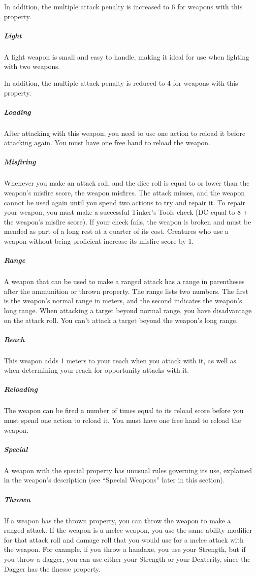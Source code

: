         In addition, the multiple attack penalty is increased to 6 for weapons with this property.
    \subparagraph{Light}
        A light weapon is small and easy to handle, making it ideal for use when fighting with two weapons.

        In addition, the multiple attack penalty is reduced to 4 for weapons with this property.
    \subparagraph{Loading}
        After attacking with this weapon, you need to use one action to reload it before attacking again.
        You must have one free hand to reload the weapon.
    \subparagraph{Misfiring}
        Whenever you make an attack roll, and the dice roll is equal to or lower than the weapon’s misfire score, the weapon misfires.
        The attack misses, and the weapon cannot be used again until you spend two actions to try and repair it.
        To repair your weapon, you must make a successful Tinker’s Tools check (DC equal to 8 + the weapon's misfire score).
        If your check fails, the weapon is broken and must be mended as part of a long rest at a quarter of its cost.
        Creatures who use a weapon without being proficient increase its misfire score by 1.
    \subparagraph{Range}
        A weapon that can be used to make a ranged attack has a range in parentheses after the ammunition or thrown property.
        The range lists two numbers.
        The first is the weapon’s normal range in meters, and the second indicates the weapon’s long range.
        When attacking a target beyond normal range, you have disadvantage on the attack roll.
        You can’t attack a target beyond the weapon’s long range.
    \subparagraph{Reach}
        This weapon adds 1 meters to your reach when you attack with it, as well as when determining your reach for opportunity attacks with it.
    \subparagraph{Reloading}
        The weapon can be fired a number of times equal to its reload score before you must spend one action to reload it.
        You must have one free hand to reload the weapon.
    \subparagraph{Special}
        A weapon with the special property has unusual rules governing its use, explained in the weapon’s description (see ``Special Weapons'' later in this section).
    \subparagraph{Thrown}
        If a weapon has the thrown property, you can throw the weapon to make a ranged attack.
        If the weapon is a melee weapon, you use the same ability modifier for that attack roll and damage roll that you would use for a melee attack with the weapon.
        For example, if you throw a handaxe, you use your Strength, but if you throw a dagger, you can use either your Strength or your Dexterity, since the Dagger has the finesse property.
